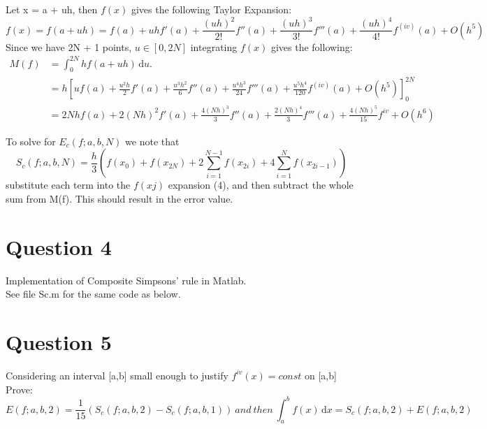 \documentclass[fleqn]{report}
\begin{document}
\noindent Let x = a + uh, then $f(x)$ gives the following Taylor Expansion:
\begin{equation}
f(x) = f(a + uh) = f(a) + uhf'(a) + \frac{(uh)^2}{2!}f''(a) + \frac{(uh)^3}{3!}f'''(a) + \frac{(uh)^4}{4!}f^{(iv)}(a) + O(h^5)
\end{equation}
Since we have 2N + 1 points, $u \in [0, 2N]$ integrating $f(x)$ gives the following:
\begin{equation}
\begin{split}
M(f) &= \int_0^{2N} \! hf(a + uh) \, \mathrm{d}u.\\ 
&= h [uf(a) + \frac{u^2h}{2}f'(a) + \frac{u^3h^2}{6}f''(a) + \frac{u^4h^3}{24}f'''(a) + \frac{u^5h^4}{120}f^{(iv)}(a) + O(h^5)]_0^{2N}\\
&= 2Nhf(a) + 2(Nh)^2f'(a) + \frac{4(Nh)^3}{3}f''(a) + \frac{2(Nh)^4}{3}f'''(a) + \frac{4(Nh)^5}{15}f^{iv}+ O(h^6)
\end{split}
\end{equation}

\noindent To solve for $E_c(f;a,b,N)$ we note that 
\begin{equation*}
S_c(f;a,b,N) = \frac{h}{3} (f(x_0) + f(x_{2N}) +  2\sum_{i=1}^{N-1} f(x_{2i}) + 4\sum_{i=1}^{N} f(x_{2i-1}))
\end{equation*}
substitute each term into the $f(xj)$ expansion (4), and then subtract the whole sum from
M(f). This should result in the error value.

\pagebreak

\section{Question 4}
Implementation of Composite Simpsons' rule in Matlab. \\

See file Sc.m for the same code as below.



\pagebreak

\section{Question 5}
Considering an interval [a,b] small enough to justify $f^{iv}(x) = const$ on [a,b] Prove: 
\begin{equation*}
E(f;a,b,2) = \frac{1}{15}(S_c(f;a,b,2) - S_c(f;a,b,1))\ and\ then\ \int_a^b \! f(x) \, \mathrm{d}x  = S_c(f;a,b,2) + E(f;a,b,2)
\end{equation*}
\end{document}

